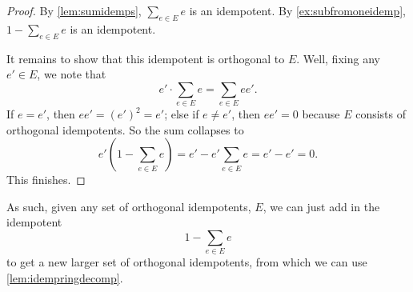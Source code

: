 \begin{proof}
	By \autoref{lem:sumidemps}, $\sum_{e\in E}e$ is an idempotent. By \autoref{ex:subfromoneidemp}, $1-\sum_{e\in E}e$ is an idempotent.

	It remains to show that this idempotent is orthogonal to $E$. Well, fixing any $e'\in E$, we note that
	\[e'\cdot\sum_{e\in E}e=\sum_{e\in E}ee'.\]
	If $e=e'$, then $ee'=(e')^2=e'$; else if $e\ne e'$, then $ee'=0$ because $E$ consists of orthogonal idempotents. So the sum collapses to
	\[e'\left(1-\sum_{e\in E}e\right)=e'-e'\sum_{e\in E}e=e'-e'=0.\]
	This finishes.
\end{proof}
As such, given any set of orthogonal idempotents, $E$, we can just add in the idempotent
\[1-\sum_{e\in E}e\]
to get a new larger set of orthogonal idempotents, from which we can use \autoref{lem:idempringdecomp}.

